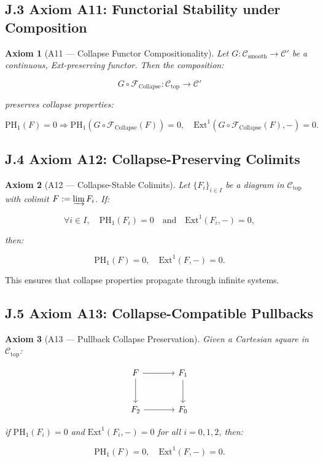 \documentclass[11pt]{article}
\newtheorem{axiom}{Axiom}[section]
\begin{document}
\subsection*{J.3 Axiom A11: Functorial Stability under Composition}

\begin{axiom}[A11 — Collapse Functor Compositionality]
Let \( G : \mathcal{C}_{\mathrm{smooth}} \to \mathcal{C}' \) be a continuous, Ext-preserving functor. Then the composition:

\[
G \circ \mathcal{F}_{\mathrm{Collapse}} : \mathcal{C}_{\mathrm{top}} \to \mathcal{C}'
\]

preserves collapse properties:

\[
\mathrm{PH}_1(F) = 0 \Rightarrow \mathrm{PH}_1(G \circ \mathcal{F}_{\mathrm{Collapse}}(F)) = 0,
\quad \mathrm{Ext}^1(G \circ \mathcal{F}_{\mathrm{Collapse}}(F), -) = 0.
\]
\end{axiom}

\subsection*{J.4 Axiom A12: Collapse-Preserving Colimits}

\begin{axiom}[A12 — Collapse-Stable Colimits]
Let \( \{ F_i \}_{i \in I} \) be a diagram in \( \mathcal{C}_{\mathrm{top}} \) with colimit \( F := \varinjlim F_i \). If:

\[
\forall i \in I, \quad \mathrm{PH}_1(F_i) = 0 \quad \text{and} \quad \mathrm{Ext}^1(F_i, -) = 0,
\]

then:

\[
\mathrm{PH}_1(F) = 0, \quad \mathrm{Ext}^1(F, -) = 0.
\]
\end{axiom}

This ensures that collapse properties propagate through infinite systems.

\subsection*{J.5 Axiom A13: Collapse-Compatible Pullbacks}

\begin{axiom}[A13 — Pullback Collapse Preservation]
Given a Cartesian square in \( \mathcal{C}_{\mathrm{top}} \):

\[
\begin{tikzcd}[row sep=large, column sep=large]
F \arrow[r] \arrow[d] & F_1 \arrow[d] \\
F_2 \arrow[r] & F_0
\end{tikzcd}
\]

if \( \mathrm{PH}_1(F_i) = 0 \) and \( \mathrm{Ext}^1(F_i, -) = 0 \) for all \( i = 0, 1, 2 \), then:

\[
\mathrm{PH}_1(F) = 0, \quad \mathrm{Ext}^1(F, -) = 0.
\]
\end{axiom}
\end{document}
